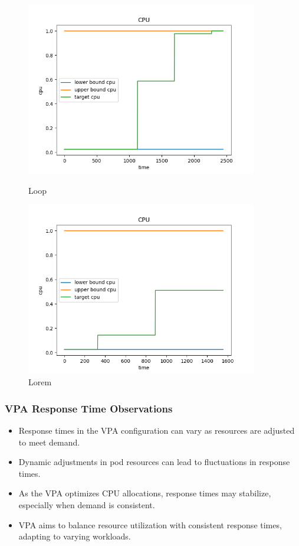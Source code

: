 \begin{figure}[h]
    \begin{minipage}[t]{0.5\textwidth}
        \centering
        \includegraphics[width=0.9\textwidth]{../sample_results/loop/vpa/cpu-utilization-vpa.png}
        \caption{Loop}
    \end{minipage}
    \hfill
    \begin{minipage}[t]{0.5\textwidth}
        \centering
        \includegraphics[width=0.9\textwidth]{../sample_results/lorem/vpa/cpu-utilization-vpa.png}
        \caption{Lorem}
    \end{minipage}
\end{figure}
\newpage
\subsubsection{VPA Response Time Observations}
\begin{itemize}
    \item Response times in the VPA configuration can vary as resources are adjusted to meet demand.
    \item Dynamic adjustments in pod resources can lead to fluctuations in response times.
    \item As the VPA optimizes CPU allocations, response times may stabilize, especially when demand is consistent.
    \item VPA aims to balance resource utilization with consistent response times, adapting to varying workloads.
\end{itemize}

